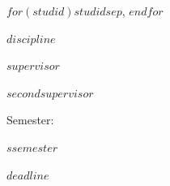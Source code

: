 \documentclass[$if(fontsize)$$fontsize$,$endif$$if(lang)$$lang$,$endif$$if(papersize)$$papersize$,$endif$$for(classoption)$$classoption$$sep$,$endfor$]{$documentclass$}
\begin{document}
\begin{titlepage}
  \noindent\begin{minipage}[t]{0.5\textwidth}
  \end{minipage}
  \begin{minipage}[t]{0.7\textwidth}
  \hspace{1cm}$for(studid)$$studid$$sep$, $endfor$
  \end{minipage}

  \noindent\begin{minipage}[t]{0.5\textwidth}
  \end{minipage}
  \begin{minipage}[t]{0.7\textwidth}
  \hspace{1cm}$discipline$
  \end{minipage}

  \noindent\begin{minipage}[t]{0.5\textwidth}
  \end{minipage}
  \begin{minipage}[t]{0.7\textwidth}
  \hspace{1cm}$supervisor$
  \end{minipage}

  \noindent\begin{minipage}[t]{0.5\textwidth}
  \end{minipage}
  \begin{minipage}[t]{0.7\textwidth}
  \hspace{1cm}$secondsupervisor$
  \end{minipage}

  \noindent\begin{minipage}[t]{0.5\textwidth}
  Semester:
  \end{minipage}
  \begin{minipage}[t]{0.7\textwidth}
  \hspace{1cm}$ssemester$
  \end{minipage}

  \noindent\begin{minipage}[t]{0.5\textwidth}
  \end{minipage}
  \begin{minipage}[t]{0.7\textwidth}
  \hspace{1cm}$deadline$
  \end{minipage}

\end{titlepage}
\end{document}
